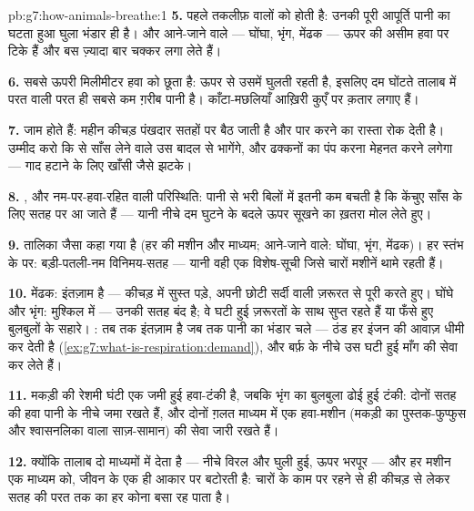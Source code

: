 \begin{solution}{pb:g7:how-animals-breathe:1}
\textbf{5.} पहले तकलीफ़  वालों को होती है: उनकी पूरी आपूर्ति पानी
का घटता हुआ घुला भंडार ही है। और आने-जाने वाले --- घोंघा, भृंग, मेंढक
--- ऊपर की असीम हवा पर टिके हैं और बस ज़्यादा बार चक्कर लगा लेते हैं।

\textbf{6.} सबसे ऊपरी मिलीमीटर हवा को छूता है: ऊपर से  उसमें घुलती
रहती है, इसलिए दम घोंटते तालाब में परत वाली परत ही सबसे कम ग़रीब पानी
है। काँटा-मछलियाँ आख़िरी कुएँ पर क़तार लगाए हैं।

\textbf{7.}  जाम होते हैं: महीन कीचड़ पंखदार सतहों पर बैठ जाती है
और पार करने का रास्ता रोक देती है। उम्मीद करो कि  से साँस लेने वाले
उस बादल से भागेंगे, और ढक्कनों का पंप करना मेहनत करने लगेगा --- गाद हटाने
के लिए खाँसी जैसे झटके।

\textbf{8.} , और नम-पर-हवा-रहित वाली परिस्थिति: पानी से भरी
बिलों में इतनी कम  बचती है कि केंचुए साँस के लिए सतह पर आ जाते हैं
--- यानी नीचे दम घुटने के बदले ऊपर सूखने का ख़तरा मोल लेते हुए।

\textbf{9.} तालिका जैसा कहा गया है (हर  की मशीन और माध्यम;
आने-जाने वाले: घोंघा, भृंग, मेंढक)। हर स्तंभ के  पर:
बड़ी-पतली-नम विनिमय-सतह --- यानी वही एक विशेष-सूची जिसे चारों मशीनें
थामे रहती हैं।

\textbf{10.} मेंढक: इंतज़ाम है --- कीचड़ में सुस्त पड़े, अपनी छोटी सर्दी
वाली ज़रूरत  से पूरी करते हुए। घोंघे और भृंग: मुश्किल में ---
उनकी सतह बंद है; वे घटी हुई ज़रूरतों के साथ सुप्त रहते हैं या फँसे हुए
बुलबुलों के सहारे। : तब तक इंतज़ाम है जब तक पानी का भंडार चले
--- ठंड हर इंजन की आवाज़ धीमी कर देती है
(\cref{ex:g7:what-is-respiration:demand}), और  बर्फ़ के नीचे उस
घटी हुई माँग की सेवा कर लेते हैं।

\textbf{11.} मकड़ी की रेशमी घंटी एक जमी हुई हवा-टंकी है, जबकि भृंग का
बुलबुला ढोई हुई टंकी: दोनों सतह की हवा पानी के नीचे जमा रखते हैं, और
दोनों ग़लत माध्यम में एक हवा-मशीन (मकड़ी का पुस्तक-फुप्फुस और
श्वासनलिका वाला साज़-सामान) की सेवा जारी रखते हैं।

\textbf{12.} क्योंकि तालाब  दो माध्यमों में देता है --- नीचे विरल
और घुली हुई, ऊपर भरपूर --- और हर मशीन एक माध्यम को, जीवन के एक ही आकार
पर बटोरती है: चारों के काम पर रहने से ही कीचड़ से लेकर सतह की परत तक
का हर कोना बसा रह पाता है।
\end{solution}
